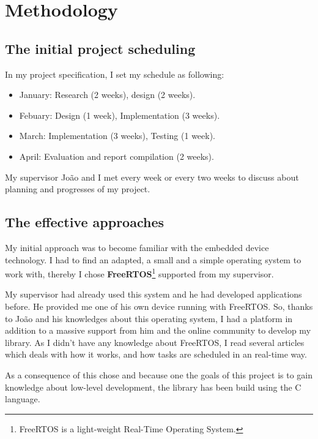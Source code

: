 \chapter{Methodology}

\section{The initial project scheduling}

\hspace{15mm}In my project specification, I set my schedule as following:
\begin{itemize}
\item January: Research (2 weeks), design (2 weeks).
\item Febuary: Design (1 week), Implementation (3 weeks).
\item March: Implementation (3 weeks), Testing (1 week).
\item April: Evaluation and report compilation (2 weeks).
\end{itemize}

My supervisor Jo\~{a}o and I met every week or every two weeks to discuss about planning and progresses of my project. 


\section{The effective approaches}

\hspace{15mm}My initial approach was to become familiar with the embedded device technology. I had to find an adapted, a small and a simple operating system to work with, thereby I chose \textbf{FreeRTOS}\footnote{FreeRTOS is a light-weight Real-Time Operating System.} supported from my supervisor.

My supervisor had already used this system and he had developed applications before. He provided me one of his own device running with FreeRTOS. So, thanks to Jo\~{a}o and his knowledges about this operating system, I had a platform in addition to a massive support from him and the online community to develop my library. As I didn't have any knowledge about FreeRTOS, I read several articles which deals with how it works, and how tasks are scheduled in an real-time way.

As a consequence of this chose and because one the goals of this project is to gain knowledge about low-level development, the library has been build using the C language.


